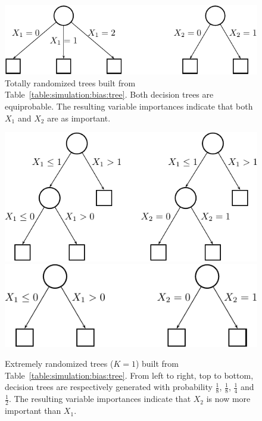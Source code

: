 \begin{figure}
    \centering
    \includegraphics[scale=1.0]{figures/ch7_trees_id3.pdf}
    \caption{Totally randomized trees built from Table~\ref{table:simulation:bias:tree}. Both decision trees are equiprobable. The resulting variable importances indicate that both $X_1$ and $X_2$ are as important. }
    \label{fig:7:bias:trees:id3}
\end{figure}
\begin{figure}
    \centering
    \includegraphics[scale=1.0]{figures/ch7_trees_ets.pdf}\vspace{1cm}\\
    \includegraphics[scale=1.0]{figures/ch7_trees_ets2.pdf}
    \caption{Extremely randomized trees ($K=1$) built from Table~\ref{table:simulation:bias:tree}. From left to right, top to bottom, decision trees are respectively generated with probability $\tfrac{1}{8}$, $\tfrac{1}{8}$, $\tfrac{1}{4}$ and $\tfrac{1}{2}$. The resulting variable importances indicate that $X_2$ is now more important than $X_1$. }
    \label{fig:7:bias:trees:ets}
\end{figure}

